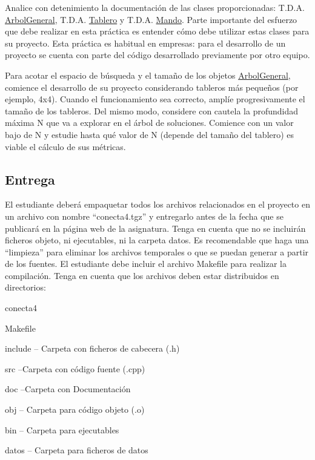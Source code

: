 \begin{DoxyItemize}
\item Analice con detenimiento la documentación de las clases proporcionadas\+: T.\+D.\+A. \hyperlink{classArbolGeneral}{Arbol\+General}, T.\+D.\+A. \hyperlink{classTablero}{Tablero} y T.\+D.\+A. \hyperlink{classMando}{Mando}. Parte importante del esfuerzo que debe realizar en esta práctica es entender cómo debe utilizar estas clases para su proyecto. Esta práctica es habitual en empresas\+: para el desarrollo de un proyecto se cuenta con parte del código desarrollado previamente por otro equipo.
\item Para acotar el espacio de búsqueda y el tamaño de los objetos \hyperlink{classArbolGeneral}{Arbol\+General}, comience el desarrollo de su proyecto considerando tableros más pequeños (por ejemplo, 4x4). Cuando el funcionamiento sea correcto, amplíe progresivamente el tamaño de los tableros. Del mismo modo, considere con cautela la profundidad máxima N que va a explorar en el árbol de soluciones. Comience con un valor bajo de N y estudie hasta qué valor de N (depende del tamaño del tablero) es viable el cálculo de sus métricas.
\end{DoxyItemize}\hypertarget{index_entrega}{}\subsection{Entrega}\label{index_entrega}
El estudiante deberá empaquetar todos los archivos relacionados en el proyecto en un archivo con nombre “conecta4.\+tgz” y entregarlo antes de la fecha que se publicará en la página web de la asignatura. Tenga en cuenta que no se incluirán ficheros objeto, ni ejecutables, ni la carpeta datos. Es recomendable que haga una “limpieza” para eliminar los archivos temporales o que se puedan generar a partir de los fuentes. El estudiante debe incluir el archivo Makefile para realizar la compilación. Tenga en cuenta que los archivos deben estar distribuidos en directorios\+:

conecta4
\begin{DoxyItemize}
\item Makefile
\item include -- Carpeta con ficheros de cabecera (.h)
\item src --Carpeta con código fuente (.cpp)
\item doc --Carpeta con Documentación
\item obj -- Carpeta para código objeto (.o)
\item bin -- Carpeta para ejecutables
\item datos -- Carpeta para ficheros de datos
\end{DoxyItemize}

